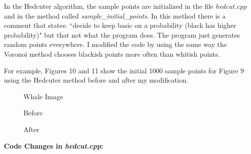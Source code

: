 \documentclass[11pt]{article}
\begin{document}
In the Hedcuter algorithm, the sample points are initialized in the file \textit{hedcut.cpp} and in the method called \textit{sample\_initial\_points}. In this method there is a comment that states: ``decide to keep basic on a probability (black has higher probability)" but that not what the program does. The program just generates random points everywhere. I modified the code by using the same way the Voronoi method chooses blackish points more often than whitish points. 

For example, Figures 10 and 11 show the initial 1000 sample points for Figure 9 using the Hedcuter method before and after my modification. 

 \hfill
 
 \begin{figure}[!htb]
    \centering 
     \begin{minipage}{0.33\textwidth}
        \centering
        \caption{\newline Whale Image}
    \end{minipage}\hfill
    \begin{minipage}{0.33\textwidth}
        \centering
        \caption{Before}
    \end{minipage}\hfill
    \begin{minipage}{0.33\textwidth}
        \centering
        \caption{After}
    \end{minipage}
\end{figure}

\hfill

\centerline{
\textbf{Code Changes in \textit{hedcut.cpp}:}
}

\begin{figure}[!htb]  
\end{figure}

\newpage
\end{document}
